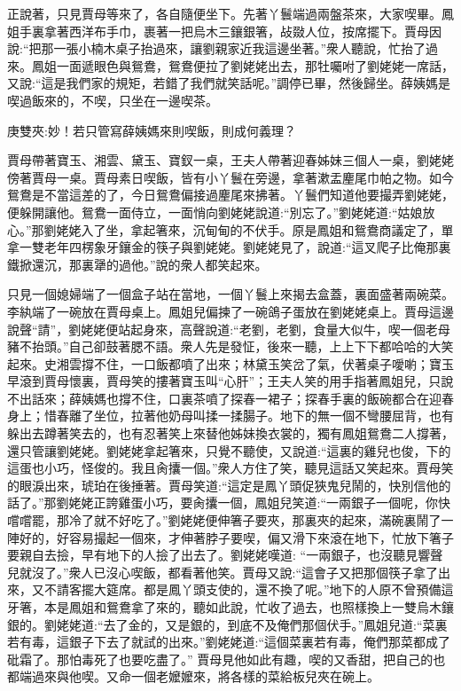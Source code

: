 \begin{parag}
    正說著，只見賈母等來了，各自隨便坐下。先著丫鬟端過兩盤茶來，大家喫畢。鳳姐手裏拿著西洋布手巾，裹著一把烏木三鑲銀箸，敁敠人位，按席擺下。賈母因說:“把那一張小楠木桌子抬過來，讓劉親家近我這邊坐著。”衆人聽說，忙抬了過來。鳳姐一面遞眼色與鴛鴦，鴛鴦便拉了劉姥姥出去，那牡囑咐了劉姥姥一席話，又說:“這是我們家的規矩，若錯了我們就笑話呢。”調停已畢，然後歸坐。薛姨媽是喫過飯來的，不喫，只坐在一邊喫茶。\begin{note}庚雙夾:妙！若只管寫薛姨媽來則喫飯，則成何義理？\end{note}賈母帶著寶玉、湘雲、黛玉、寶釵一桌，王夫人帶著迎春姊妹三個人一桌，劉姥姥傍著賈母一桌。賈母素日喫飯，皆有小丫鬟在旁邊，拿著漱盂麈尾巾帕之物。如今鴛鴦是不當這差的了，今日鴛鴦偏接過麈尾來拂著。丫鬟們知道他要撮弄劉姥姥，便躲開讓他。鴛鴦一面侍立，一面悄向劉姥姥說道:“別忘了。”劉姥姥道:“姑娘放心。”那劉姥姥入了坐，拿起箸來，沉甸甸的不伏手。原是鳳姐和鴛鴦商議定了，單拿一雙老年四楞象牙鑲金的筷子與劉姥姥。劉姥姥見了，說道:“這叉爬子比俺那裏鐵掀還沉，那裏犟的過他。”說的衆人都笑起來。
\end{parag}


\begin{parag}
    只見一個媳婦端了一個盒子站在當地，一個丫鬟上來揭去盒蓋，裏面盛著兩碗菜。李紈端了一碗放在賈母桌上。鳳姐兒偏揀了一碗鴿子蛋放在劉姥姥桌上。賈母這邊說聲“請”，劉姥姥便站起身來，高聲說道:“老劉，老劉，食量大似牛，喫一個老母豬不抬頭。”自己卻鼓著腮不語。衆人先是發怔，後來一聽，上上下下都哈哈的大笑起來。史湘雲撐不住，一口飯都噴了出來；林黛玉笑岔了氣，伏著桌子噯喲；寶玉早滾到賈母懷裏，賈母笑的摟著寶玉叫“心肝”；王夫人笑的用手指著鳳姐兒，只說不出話來；薛姨媽也撐不住，口裏茶噴了探春一裙子；探春手裏的飯碗都合在迎春身上；惜春離了坐位，拉著他奶母叫揉一揉腸子。地下的無一個不彎腰屈背，也有躲出去蹲著笑去的，也有忍著笑上來替他姊妹換衣裳的，獨有鳳姐鴛鴦二人撐著，還只管讓劉姥姥。劉姥姥拿起箸來，只覺不聽使，又說道:“這裏的雞兒也俊，下的這蛋也小巧，怪俊的。我且肏攮一個。”衆人方住了笑，聽見這話又笑起來。賈母笑的眼淚出來，琥珀在後捶著。賈母笑道:“這定是鳳丫頭促狹鬼兒鬧的，快別信他的話了。”那劉姥姥正誇雞蛋小巧，要肏攮一個，鳳姐兒笑道:“一兩銀子一個呢，你快嚐嚐罷，那冷了就不好吃了。”劉姥姥便伸箸子要夾，那裏夾的起來，滿碗裏鬧了一陣好的，好容易撮起一個來，才伸著脖子要喫，偏又滑下來滾在地下，忙放下箸子要親自去撿，早有地下的人撿了出去了。劉姥姥嘆道: “一兩銀子，也沒聽見響聲兒就沒了。”衆人已沒心喫飯，都看著他笑。賈母又說:“這會子又把那個筷子拿了出來，又不請客擺大筵席。都是鳳丫頭支使的，還不換了呢。”地下的人原不曾預備這牙箸，本是鳳姐和鴛鴦拿了來的，聽如此說，忙收了過去，也照樣換上一雙烏木鑲銀的。劉姥姥道:“去了金的，又是銀的，到底不及俺們那個伏手。”鳳姐兒道:“菜裏若有毒，這銀子下去了就試的出來。”劉姥姥道:“這個菜裏若有毒，俺們那菜都成了砒霜了。那怕毒死了也要吃盡了。” 賈母見他如此有趣，喫的又香甜，把自己的也都端過來與他喫。又命一個老嬤嬤來，將各樣的菜給板兒夾在碗上。
\end{parag}


